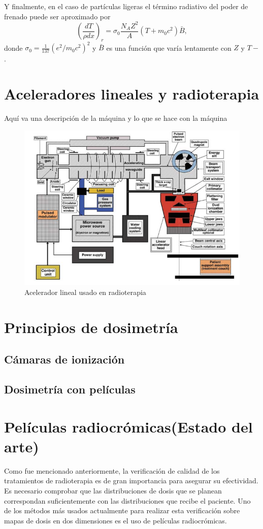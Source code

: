 Y finalmente, en el caso de partículas ligeras el término radiativo del poder de frenado puede ser aproximado por 
\begin{equation}\left(\frac{d T}{\rho d x}\right)_{r}=\sigma_{0} \frac{N_{A} Z^{2}}{A}\left(T+m_{0} c^{2}\right) \bar{B},\end{equation}
donde $\sigma_0=\frac{1}{137}(e^2/m_0c^2)^2$ y $\bar{B}$ es una función que varía lentamente con $Z$ y $T-$.

\section{Aceleradores lineales y radioterapia}
Aquí va una descripción de la máquina y lo que se hace con la máquina
\begin{figure}[H]
	\centering
	\includegraphics[width=0.9\linewidth]{images/linalc.png}
	\caption{Acelerador lineal usado en radioterapia}
	\label{fig:acelerador}
\end{figure}
\section{Principios de dosimetría}
\subsection{Cámaras de ionización}
\subsection{Dosimetría con películas}
\section{Películas radiocrómicas(Estado del arte)}
Como fue mencionado anteriormente, la verificación de calidad de los tratamientos de radioterapia es de gran importancia para asegurar su efectividad. Es necesario comprobar que las distribuciones de dosis que se planean correspondan suficientemente con las distribuciones que recibe el paciente. Uno de los métodos más usados actualmente para realizar esta verificación sobre mapas de dosis en dos dimensiones es el uso de películas radiocrómicas.\\

